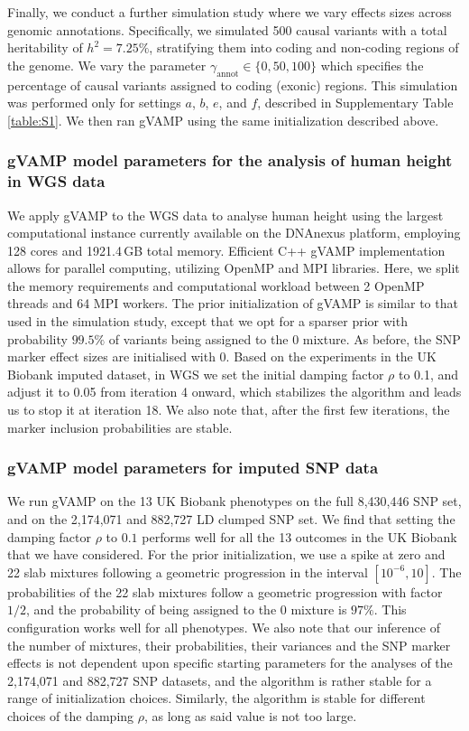 Finally, we conduct a further simulation study where we vary effects sizes across genomic annotations. Specifically, we simulated 500 causal variants with a total heritability of $h^2=7.25\%$, stratifying them into coding and non-coding regions of the genome. We vary the parameter $\gamma_\text{annot} \in \{0, 50, 100 \}$ which specifies the percentage of causal variants assigned to coding (exonic) regions. This simulation was performed only for settings $a$, $b$, $e$, and $f$, described in Supplementary Table \ref{table:S1}. We then ran gVAMP using the same initialization described above.


\subsubsection{gVAMP model parameters for the analysis of human height in WGS data}
We apply gVAMP to the WGS data to analyse human height using the largest computational instance currently available on the DNAnexus platform, employing 128 cores and 1921.4\,GB total memory. Efficient C++ gVAMP implementation allows for parallel computing, utilizing OpenMP and MPI libraries. Here, we split the memory requirements and computational workload between 2 OpenMP threads and 64 MPI workers. The prior initialization of gVAMP is similar to that used in the simulation study, except that we opt for a sparser prior with probability $99.5\%$ of variants being assigned to the 0 mixture. As before, the SNP marker effect sizes are initialised with $0$. Based on the experiments in the UK Biobank imputed dataset, in WGS we set the initial damping factor $\rho$ to 0.1, and adjust it to 0.05 from iteration 4 onward, which stabilizes the algorithm and leads us to stop it at iteration 18. We also note that, after the first few iterations, the marker inclusion probabilities are stable. 

\subsubsection{gVAMP model parameters for imputed SNP data}
We run gVAMP on the 13 UK Biobank phenotypes on the full 8,430,446 SNP set, and on the 2,174,071 and 882,727 LD clumped SNP set. We find that setting the damping factor $\rho$ to $0.1$ performs well for all the 13 outcomes in the UK Biobank that we have considered. For the prior initialization, we use a spike at zero and 22 slab mixtures following a geometric progression in the interval $[10^{-6}, 10]$. The probabilities of the 22 slab mixtures follow a geometric progression with factor $1/2$, and the probability of being assigned to the $0$ mixture is $97\%$. This configuration works well for all phenotypes. We also note that our inference of the number of mixtures, their probabilities, their variances and the SNP marker effects is not dependent upon specific starting parameters for the analyses of the 2,174,071 and 882,727 SNP datasets, and the algorithm is rather stable for a range of initialization choices. Similarly, the algorithm is stable for different choices of the damping $\rho$, as long as said value is not too large.  

